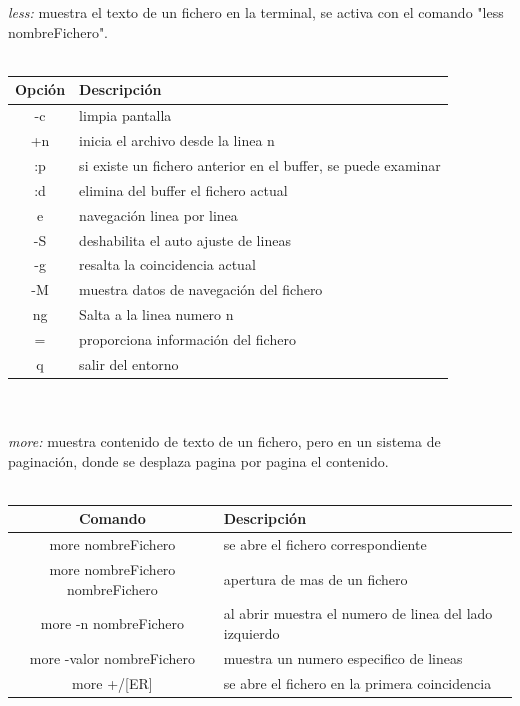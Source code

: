\documentclass[10pt,a4paper,titlepage]{article}
\begin{document}
	\\
	\\
	\emph{less:} muestra el texto de un fichero en la terminal, se activa con el comando "less nombreFichero".
	\\
	\\
	\begin{tabular}{|c|p{8cm}|}
		\hline
		Opción & Descripción \\
		\hline
		-c & limpia pantalla \\
		\hline
		+n & inicia el archivo desde la linea n \\
		\hline
		:p & si existe un fichero anterior en el buffer, se puede examinar \\
		\hline
		:d & elimina del buffer el fichero actual \\
		\hline
		e & navegación linea por linea \\
		\hline
		-S & deshabilita el auto ajuste de lineas \\
		\hline
		-g & resalta la coincidencia actual \\
		\hline
		-M & muestra datos de navegación del fichero \\
		\hline
		ng & Salta a la linea numero n \\
		\hline
		= & proporciona información del fichero \\
		\hline
		q & salir del entorno \\
		\hline
	\end{tabular}
	\\
	\\
	\emph{more:} muestra contenido de texto de un fichero, pero en un sistema de paginación, donde se desplaza pagina por pagina el contenido.
	\\
	\\
	\begin{tabular}{|c|p{8cm}|}
		\hline
		Comando & Descripción \\
		\hline
		more nombreFichero & se abre el fichero correspondiente \\
		\hline
		more nombreFichero nombreFichero & apertura de mas de un fichero \\
		\hline
		more -n nombreFichero & al abrir muestra el numero de linea del lado izquierdo \\
		\hline
		more -valor nombreFichero & muestra un numero especifico de lineas \\
		\hline
		more +/[ER] & se abre el fichero en la primera coincidencia \\
		\hline
	\end{tabular}
\end{document}
